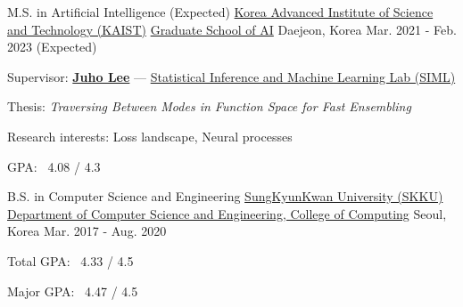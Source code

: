 \documentclass[11pt, a4paper]{cv}
\begin{document}
\makecvheader


\begin{cventries}

  \cveducation
    {M.S. in Artificial Intelligence (Expected)} %
    {\href{https://www.kaist.ac.kr/en/}{Korea Advanced Institute of Science and Technology (KAIST)}} %
    {\href{https://gsai.kaist.ac.kr}{Graduate School of AI}} %
    {Daejeon, Korea} %
    {Mar. 2021 - Feb. 2023 (Expected)} %
    {
      \begin{cvitems} %
        \item {
          Supervisor: \href{https://juho-lee.github.io}{\bfseries\color{graytext} Juho Lee}
                  --- \href{https://siml.kaist.ac.kr}{Statistical Inference and Machine Learning Lab (SIML)}
        }
        \item {Thesis: \textit{Traversing Between Modes in Function Space for Fast Ensembling}}
        \item {Research interests: Loss landscape, Neural processes}
        \item {GPA: \ 4.08 / 4.3}
      \end{cvitems}
    }

  \cveducation
    {B.S. in Computer Science and Engineering} %
    {\href{https://www.skku.edu/eng/}{SungKyunKwan University (SKKU)}} %
    {\href{https://cs.skku.edu/en/college/department/cse_intro}{Department of Computer Science and Engineering, College of Computing}} %
    {Seoul, Korea} %
    {Mar. 2017 - Aug. 2020} %
    {
      \begin{cvitems} %
        \item {Total GPA: \, 4.33 / 4.5}
        \item {Major GPA: \  4.47 / 4.5}
      \end{cvitems}
    }

\end{cventries}
\end{document}
